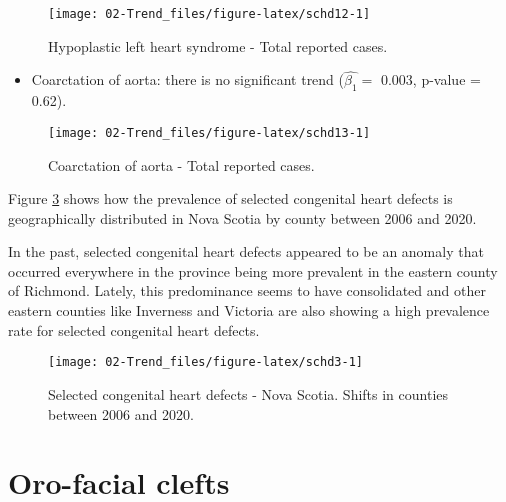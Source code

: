 \documentclass[
]{krantz}
\providecommand{\tightlist}{%
  \setlength{\itemsep}{0pt}\setlength{\parskip}{0pt}}
\begin{document}
\begin{figure}[h]

{\centering \texttt{[image: 02-Trend\_files/figure-latex/schd12-1]} 

}

\caption{Hypoplastic left heart syndrome - Total reported cases.}\label{fig:schd12}
\end{figure}

\begin{itemize}
\tightlist
\item
  Coarctation of aorta: there is no significant trend (\(\hat{\beta_{1}} =\) 0.003, p-value = 0.62).
\end{itemize}

\begin{figure}[h]

{\centering \texttt{[image: 02-Trend\_files/figure-latex/schd13-1]} 

}

\caption{Coarctation of aorta - Total reported cases.}\label{fig:schd13}
\end{figure}

Figure \ref{fig:schd3} shows how the prevalence of selected congenital heart defects is geographically distributed in Nova Scotia by county between 2006 and 2020.

In the past, selected congenital heart defects appeared to be an anomaly that occurred everywhere in the province being more prevalent in the eastern county of Richmond. Lately, this predominance seems to have consolidated and other eastern counties like Inverness and Victoria are also showing a high prevalence rate for selected congenital heart defects.

\begin{figure}[h]

{\centering \texttt{[image: 02-Trend\_files/figure-latex/schd3-1]} 

}

\caption{Selected congenital heart defects - Nova Scotia. Shifts in counties between 2006 and 2020.}\label{fig:schd3}
\end{figure}

\clearpage

\hypertarget{section36}{%
\section{Oro-facial clefts}\label{section36}}
\end{document}
